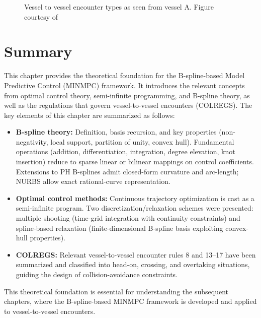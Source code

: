 \begin{figure}
    \centering
    
    \caption{Vessel to vessel encounter types as seen from vessel A. Figure courtesy of \cite{Thyri2022-VO}}
    \label{fig:v2v-encounters}
\end{figure}



%     




\section{Summary}
This chapter provides the theoretical foundation for the B-spline-based Model Predictive Control (MINMPC) framework. It introduces the relevant concepts from optimal control theory, semi-infinite programming, and B-spline theory, as well as the regulations that govern vessel-to-vessel encounters (COLREGS).
The key elements of this chapter are summarized as follows:
\begin{itemize}
    \item \textbf{B-spline theory:}  
      Definition, basis recursion, and key properties (non-negativity, local support, partition of unity, convex hull). Fundamental operations (addition, differentiation, integration, degree elevation, knot insertion) reduce to sparse linear or bilinear mappings on control coefficients. Extensions to PH B-splines admit closed-form curvature and arc-length; NURBS allow exact rational-curve representation.
    \item \textbf{Optimal control methods:}  
      Continuous trajectory optimization is cast as a semi‐infinite program. Two discretization/relaxation schemes were presented: multiple shooting (time‐grid integration with continuity constraints) and spline‐based relaxation (finite-dimensional B-spline basis exploiting convex-hull properties).
  \item \textbf{COLREGS:}  
    Relevant vessel-to-vessel encounter rules 8 and 13–17 have been summarized and classified into head-on, crossing, and overtaking situations, guiding the design of collision-avoidance constraints.
\end{itemize}
This theoretical foundation is essential for understanding the subsequent chapters, where the B-spline-based MINMPC framework is developed and applied to vessel-to-vessel encounters.